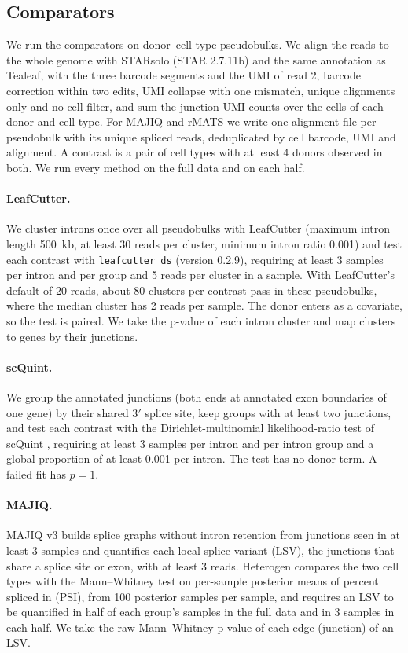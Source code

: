 \documentclass[11pt]{article}
\begin{document}
\subsection{Comparators}
\label{sec:comparators}

We run the comparators on donor--cell-type pseudobulks. We align the reads to the whole genome with STARsolo (STAR 2.7.11b) \cite{dobin2013,kaminow2021} and the same annotation as Tealeaf, with the three barcode segments and the UMI of read 2, barcode correction within two edits, UMI collapse with one mismatch, unique alignments only and no cell filter, and sum the junction UMI counts over the cells of each donor and cell type. For MAJIQ and rMATS we write one alignment file per pseudobulk with its unique spliced reads, deduplicated by cell barcode, UMI and alignment. A contrast is a pair of cell types with at least 4 donors observed in both. We run every method on the full data and on each half.

\paragraph{LeafCutter.} We cluster introns once over all pseudobulks with LeafCutter \cite{li2018} (maximum intron length 500~kb, at least 30 reads per cluster, minimum intron ratio 0.001) and test each contrast with \texttt{leafcutter\_ds} (version 0.2.9), requiring at least 3 samples per intron and per group and 5 reads per cluster in a sample. With LeafCutter's default of 20 reads, about 80 clusters per contrast pass in these pseudobulks, where the median cluster has 2 reads per sample. The donor enters as a covariate, so the test is paired. We take the p-value of each intron cluster and map clusters to genes by their junctions.

\paragraph{scQuint.} We group the annotated junctions (both ends at annotated exon boundaries of one gene) by their shared 3$'$ splice site, keep groups with at least two junctions, and test each contrast with the Dirichlet-multinomial likelihood-ratio test of scQuint \cite{benegas2022}, requiring at least 3 samples per intron and per intron group and a global proportion of at least 0.001 per intron. The test has no donor term. A failed fit has $p=1$.

\paragraph{MAJIQ.} MAJIQ v3 \cite{vaquerogarcia2023} builds splice graphs without intron retention from junctions seen in at least 3 samples and quantifies each local splice variant (LSV), the junctions that share a splice site or exon, with at least 3 reads. Heterogen compares the two cell types with the Mann--Whitney test on per-sample posterior means of percent spliced in (PSI), from 100 posterior samples per sample, and requires an LSV to be quantified in half of each group's samples in the full data and in 3 samples in each half. We take the raw Mann--Whitney p-value of each edge (junction) of an LSV.
\end{document}
